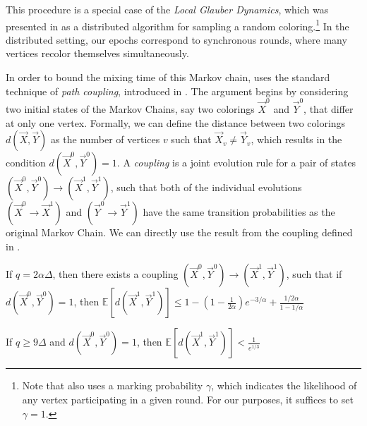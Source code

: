 This procedure is a special case of the \emph{Local Glauber Dynamics},
which was presented in \cite{ghaffari_fischer} as a distributed algorithm for sampling a random coloring.\footnote{
Note that \cite{ghaffari_fischer} also uses a marking probability $\gamma$,
which indicates the likelihood of any vertex participating in a given round.
For our purposes, it suffices to set $\gamma = 1$.}
In the distributed setting, our epochs correspond to synchronous rounds, where many vertices recolor themselves simultaneously.

In order to bound the mixing time of this Markov chain,
\cite{ghaffari_fischer} uses the standard technique of \emph{path coupling}, introduced in \cite{path_coupling}.
The argument begins by considering two initial states of the Markov Chains, say two colorings $\vec X^0$ and $\vec Y^0$,
that differ at only one vertex.
Formally, we can define the distance between two colorings $d(\vec X,\vec Y)$ as the number of vertices $v$ such that $\vec X_v\not= \vec Y_v$,
which results in the condition $d(\vec X^0, \vec Y^0) = 1$.
A \emph{coupling} is a joint evolution rule for a pair of states $(\vec X^0,\vec Y^0)\rightarrow(\vec X^1,\vec Y^1)$,
such that both of the individual evolutions $(\vec X^0\rightarrow \vec X^1)$ and $(\vec Y^0\rightarrow \vec Y^1)$
have the same transition probabilities as the original Markov Chain.
We can directly use the result from the coupling defined in \cite{ghaffari_fischer}.
\begin{lemma}
\label{lem:ghaffari_fischer_single_epoch_distance}
If $q = 2\alpha\Delta$, then there exists a coupling $(\vec X^0,\vec Y^0)\rightarrow(\vec X^1,\vec Y^1)$, such that if $d(\vec X^0, \vec Y^0) = 1$,
then $\mathbb E[d(\vec X^1,\vec Y^1)] \le 1-\left( 1-\frac1{2\alpha}\right)e^{-3/\alpha} + \frac{1/2\alpha}{1-1/\alpha}$
\end{lemma}
\begin{corollary}
\label{cor:single_epoch_distansce}
If $q \ge 9\Delta$ and $d(\vec X^0, \vec Y^0) = 1$, then $\mathbb E[d(\vec X^1,\vec Y^1)] < \frac1{e^{1/3}}$
\end{corollary}

